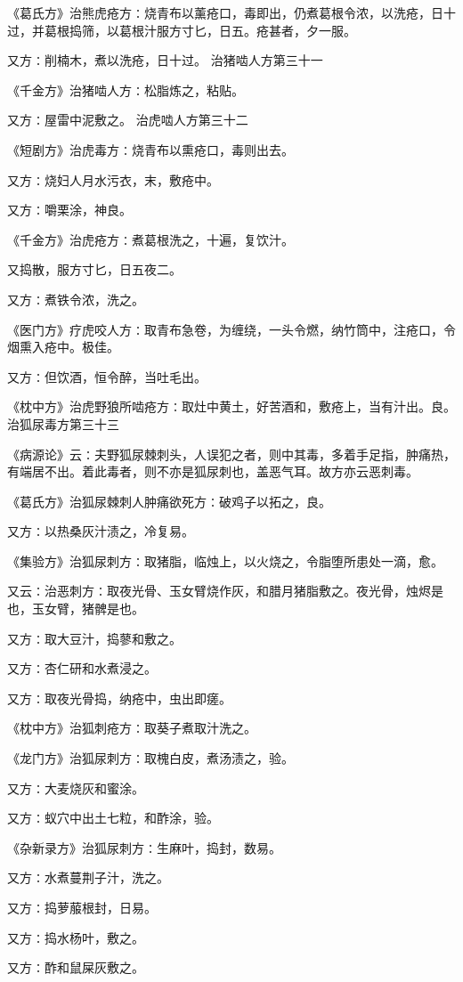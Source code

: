 \documentclass[a4paper,12pt,UTF8,twoside]{ctexbook}
\begin{document}
《葛氏方》治熊虎疮方∶烧青布以薰疮口，毒即出，仍煮葛根令浓，以洗疮，日十过，并葛根捣筛，以葛根汁服方寸匕，日五。疮甚者，夕一服。

又方∶削楠木，煮以洗疮，日十过。
治猪啮人方第三十一

《千金方》治猪啮人方∶松脂炼之，粘贴。

又方∶屋雷中泥敷之。
治虎啮人方第三十二

《短剧方》治虎毒方∶烧青布以熏疮口，毒则出去。

又方∶烧妇人月水污衣，末，敷疮中。

又方∶嚼栗涂，神良。

《千金方》治虎疮方∶煮葛根洗之，十遍，复饮汁。

又捣散，服方寸匕，日五夜二。

又方∶煮铁令浓，洗之。

《医门方》疗虎咬人方∶取青布急卷，为缠绕，一头令燃，纳竹筒中，注疮口，令烟熏入疮中。极佳。

又方∶但饮酒，恒令醉，当吐毛出。

《枕中方》治虎野狼所啮疮方∶取灶中黄土，好苦酒和，敷疮上，当有汁出。良。
治狐尿毒方第三十三

《病源论》云∶夫野狐尿棘刺头，人误犯之者，则中其毒，多着手足指，肿痛热，有端居不出。着此毒者，则不亦是狐尿刺也，盖恶气耳。故方亦云恶刺毒。

《葛氏方》治狐尿棘刺人肿痛欲死方∶破鸡子以拓之，良。

又方∶以热桑灰汁渍之，冷复易。

《集验方》治狐尿刺方∶取猪脂，临烛上，以火烧之，令脂堕所患处一滴，愈。

又云∶治恶刺方∶取夜光骨、玉女臂烧作灰，和腊月猪脂敷之。夜光骨，烛烬是也，玉女臂，猪髀是也。

又方∶取大豆汁，捣蓼和敷之。

又方∶杏仁研和水煮浸之。

又方∶取夜光骨捣，纳疮中，虫出即瘥。

《枕中方》治狐刺疮方∶取葵子煮取汁洗之。

《龙门方》治狐尿刺方∶取槐白皮，煮汤渍之，验。

又方∶大麦烧灰和蜜涂。

又方∶蚁穴中出土七粒，和酢涂，验。

《杂新录方》治狐尿刺方∶生麻叶，捣封，数易。

又方∶水煮蔓荆子汁，洗之。

又方∶捣萝菔根封，日易。

又方∶捣水杨叶，敷之。

又方∶酢和鼠屎灰敷之。
\end{document}
